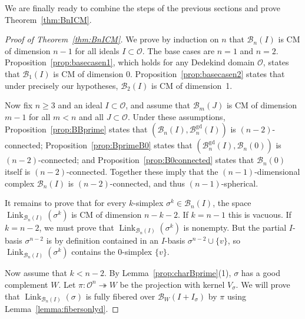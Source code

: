 \documentclass[11 pt]{article}
\theoremstyle{plain}
\newtheorem{lemma}[theorem]{Lemma}
\theoremstyle{definition}
\numberwithin{equation}{section}
\renewcommand{\O}{\mathcal{O}}
\newcommand\PartialBases{\ensuremath{\mathcal{B}}}
\newcommand{\PB}{\PartialBases}
\newcommand{\PartialBasesGood}{\PartialBases^{\text{gd}}}
\newcommand{\PBg}{\PartialBasesGood}
\DeclareMathOperator{\Link}{Link}
\newcommand\onto{\twoheadrightarrow}
\newcommand\abs[1]{\left\lvert#1\right\rvert}
\begin{document}
We are finally ready to combine the steps of the previous sections and prove Theorem~\ref{thm:BnICM}. %
\begin{proof}[Proof of Theorem~\ref{thm:BnICM}]
We prove by induction on $n$ that $\PB_n(I)$ is CM of dimension $n-1$ for all ideals $I\subset \O$. The base cases are $n=1$ and $n=2$. Proposition~\ref{prop:basecasen1}, which holds for any Dedekind domain $\O$, states that $\PB_1(I)$ is CM of dimension 0.  Proposition~\ref{prop:basecasen2} states that under precisely our hypotheses, $\PB_2(I)$ is CM of dimension~1.

Now fix $n\geq 3$ and an ideal $I\subset \O$, and assume that $\PB_m(J)$ is CM of dimension $m-1$ for all $m<n$ and all $J\subset \O$.
Under these assumptions, Proposition~\ref{prop:BBprime} states that $(\PB_n(I),\PBg_n(I))$ is $(n-2)$-connected; Proposition~\ref{prop:BprimeB0} states that $(\PBg_n(I),\PB_n(0))$ is $(n-2)$-connected; and Proposition~\ref{prop:B0connected} states that $\PB_n(0)$ itself is $(n-2)$-connected. Together these imply that the $(n-1)$-dimensional complex $\PB_n(I)$ is $(n-2)$-connected, and thus $(n-1)$-spherical.

It remains to prove that for every $k$-simplex $\sigma^k\in\PartialBases_n(I)$, the space 
$\Link_{\PB_n(I)}(\sigma^k)$ is CM of dimension $n-k-2$. If $k=n-1$ this is vacuous.
If $k=n-2$, we must prove that $\Link_{\PB_n(I)}(\sigma^k)$ is nonempty. But the partial $I$-basis $\sigma^{n-2}$ is by definition contained in an $I$-basis $\sigma^{n-2}\cup\{v\}$, so $\Link_{\PB_n(I)}(\sigma^k)$ contains the $0$-simplex $\{v\}$.

Now assume that $k<n-2$. By Lemma~\ref{prop:charBprime}(1), $\sigma$ has a good complement $W$. Let $\pi\colon \O^n\onto W$ be the projection with kernel $V_\sigma$. We will prove that $\Link_{\PB_n(I)}(\sigma)$ is fully fibered over $\PB_W(I+I_\sigma)$ by $\pi$ using Lemma~\ref{lemma:fibersonlyd}.


\end{proof}
\end{document}
